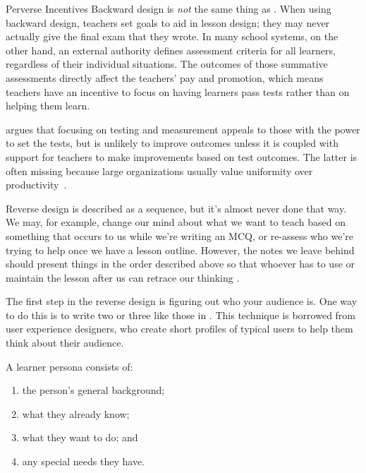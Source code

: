 \begin{aside}{Perverse Incentives}
  Backward design is \emph{not} the same thing as .
  When using backward design,
  teachers set goals to aid in lesson design;
  they may never actually give the final exam that they wrote.
  In many school systems,
  on the other hand,
  an external authority defines assessment criteria for all learners,
  regardless of their individual situations.
  The outcomes of those summative assessments directly affect the teachers' pay and promotion,
  which means teachers have an incentive to focus on having learners pass tests
  rather than on helping them learn.

  \cite{Gree2014} argues that focusing on testing and measurement
  appeals to those with the power to set the tests,
  but is unlikely to improve outcomes
  unless it is coupled with support for teachers to make improvements based on test outcomes.
  The latter is often missing because
  large organizations usually value uniformity over productivity~\cite{Scot1998}.
\end{aside}

Reverse design is described as a sequence,
but it's almost never done that way.
We may,
for example, change our mind about what we want to teach
based on something that occurs to us while we're writing an MCQ,
or re-assess who we're trying to help once we have a lesson outline.
However,
the notes we leave behind should present things in the order described above
so that whoever has to use or maintain the lesson after us can retrace our thinking
\cite{Parn1986}.


The first step in the reverse design is figuring out who your audience is.
One way to do this is to write two or three
like those in .
This technique is borrowed from user experience designers,
who create short profiles of typical users
to help them think about their audience.

A learner persona consists of:

\begin{enumerate}

\item
  the person's general background;

\item
  what they already know;

\item
  what they want to do;
  and

\item
  any special needs they have.

\end{enumerate}


